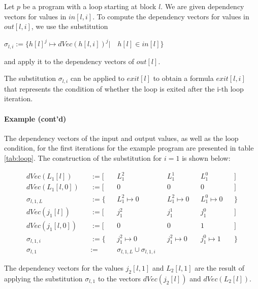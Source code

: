 \begin{definition}
    Let $p$ be a program with a loop starting at block $l$. We are given dependency vectors for values in $in[l, i]$. To compute the dependency vectors for values in $out[l, i]$, we use the substitution
    \begin{center}
        $\sigma_{l, i} := \{h[l]^j \mapsto dVec(h[l, i])^j | \quad h[l] \in in[l]\}$
    \end{center}
    and apply it to the dependency vectors of $out[l]$.
\end{definition}

The substitution $\sigma_{l, i}$ can be applied to $exit[l]$ to obtain a formula $exit[l, i]$ that represents the condition of whether the loop is exited after the i-th loop iteration.

\paragraph{Example (cont'd)} The dependency vectors of the input and output values, as well as the loop condition, for the first iterations for the example program are presented in table \ref{tab:loop}. The construction of the substitution for $i = 1$ is shown below:

\begin{align*}
dVec(L_1[l]) &&:= [ && L_1^2 && L_1^1 && L_1^0 && ]\\
dVec(L_1[l, 0]) &&:= [ && 0 && 0 && 0 && ]\\
\sigma_{l, 1, L} && := \{ && L_1^2 \mapsto 0 && L_1^2 \mapsto 0 && L_1^0 \mapsto 0 && \} \\[1em]
dVec(j_1[l]) &&:= [ && j_1^2 && j_1^1 && j_1^0 && ]\\
dVec(j_1[l, 0]) &&:= [ && 0 && 0 && 1 && ]\\
\sigma_{l, 1, i} && := \{ && j_1^2 \mapsto 0 && j_1^2 \mapsto 0 && j_1^0 \mapsto 1 && \} \\[1em]
\sigma_{l, 1} && := &&\sigma_{l, 1, L} \cup \sigma_{l, 1, i}
\end{align*}

The dependency vectors for the values $j_2[l, 1]$ and $L_2[l, 1]$ are the result of applying the substitution $\sigma_{l, 1}$ to the vectors $dVec(j_2[l])$ and $dVec(L_2[l])$.


